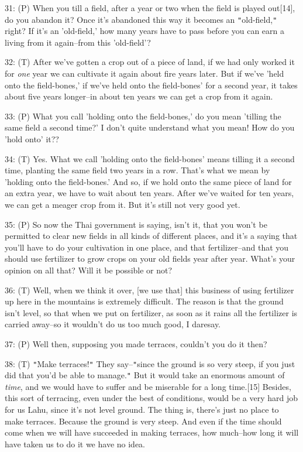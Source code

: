 31: (P) When you till a field, after a year or two when the field is played out[14],
do you abandon it? Once it's abandoned this way it becomes an \texttt{"}old-field,\texttt{"}
right? If it's an 'old-field,' how many years have to pass before you can earn
a living from it again--from this 'old-field'?

32: (T) After we've gotten a crop out of a piece of land, if we had only worked
it for \textit{one} year we can cultivate it again about fire years later. But
if we've 'held onto the field-bones,' if we've held onto the field-bones' for a
second year, it takes about five years longer--in about ten years we can get a
crop from it again.

33: (P) What you call 'holding onto the field-bones,' do you mean 'tilling the
same field a second time?' I don't quite understand what you mean! How do you 'hold
onto' it??

34: (T) Yes. What we call 'holding onto the field-bones' means tilling it a second
time, planting the same field two years in a row. That's what we mean by 'holding
onto the field-bones.' And so, if we hold onto the same piece of land for an extra
year, we have to wait about ten years. After we've waited for ten years, we can
get a meager crop from it. But it's still not very good yet.

35: (P) So now the Thai government is saying, isn't it, that you won't be permitted
to clear new fields in all kinds of different places, and it's a saying that you'll
have to do your cultivation in one place, and that fertilizer--and that you should
use fertilizer to grow crops on your old fields year after year. What's your opinion
on all that? Will it be possible or not?

36: (T) Well, when we think it over, [we use that] this business of using fertilizer
up here in the mountains is extremely difficult. The reason is that the ground
isn't level, so that when we put on fertilizer, as soon as it rains all the fertilizer
is carried away--so it wouldn't do us too much good, I daresay.

37: (P) Well then, supposing you made terraces, couldn't you do it then?

38: (T) \texttt{"}Make terraces!\texttt{"} They say--\texttt{"}since the ground
is so very steep, if you just did that you'd be able to manage.\texttt{"} But it
would take an enormous amount of \textit{time}, and we would have to suffer and
be miserable for a long time.[15] Besides, this sort of terracing, even under the
best of conditions, would be a very hard job for us Lahu, since it's not level
ground. The thing is, there's just no place to make terraces. Because the ground
is very steep. And even if the time should come when we will have succeeded in
making terraces, how much--how long it will have taken us to do it we have no idea.

